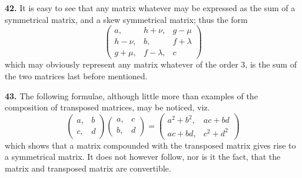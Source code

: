 \documentclass[12pt,a4paper]{article}
\theoremstyle{definition}
\begin{document}
\medskip
\noindent\textbf{42.} It is easy to see that any matrix whatever may be expressed as the sum of a symmetrical matrix, and a skew symmetrical matrix; thus the form
\[
\begin{pmatrix} a, & h+\nu, & g-\mu \\ h-\nu, & b, & f+\lambda \\ g+\mu, & f-\lambda, & c \end{pmatrix}
\]
which may obviously represent any matrix whatever of the order 3, is the sum of the two matrices last before mentioned.

\medskip
\noindent\textbf{43.} The following formulae, although little more than examples of the composition of transposed matrices, may be noticed, viz.
\[
\begin{pmatrix} a, & b \\ c, & d \end{pmatrix}
\begin{pmatrix} a, & c \\ b, & d \end{pmatrix}
=
\begin{pmatrix} a^2+b^2, & ac+bd \\ ac+bd, & c^2+d^2 \end{pmatrix}
\]
which shows that a matrix compounded with the transposed matrix gives rise to a symmetrical matrix. It does not however follow, nor is it the fact, that the matrix and transposed matrix are convertible.
\end{document}
